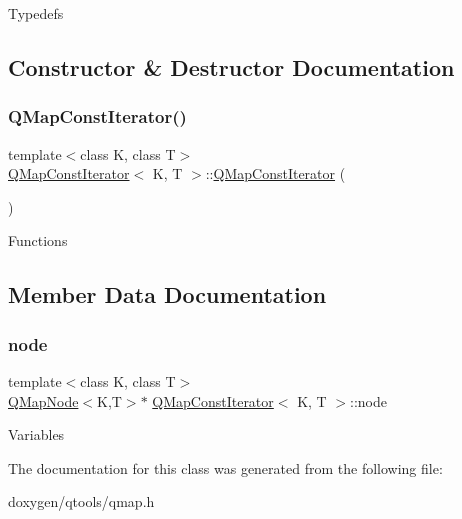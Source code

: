 Typedefs 

\subsection{Constructor \& Destructor Documentation}
\mbox{\label{class_q_map_const_iterator_a86b9986fefaa47f9991d997993074309}} 
\subsubsection{\texorpdfstring{QMapConstIterator()}{QMapConstIterator()}}
{\footnotesize\ttfamily template$<$class K, class T$>$ \\
\mbox{\hyperlink{class_q_map_const_iterator}{Q\+Map\+Const\+Iterator}}$<$ K, T $>$\+::\mbox{\hyperlink{class_q_map_const_iterator}{Q\+Map\+Const\+Iterator}} (\begin{DoxyParamCaption}{ }\end{DoxyParamCaption})\hspace{0.3cm}{\ttfamily [inline]}}

Functions 

\subsection{Member Data Documentation}
\mbox{\label{class_q_map_const_iterator_a8f46f6a6172b01945bae3ca296e3f156}} 
\subsubsection{\texorpdfstring{node}{node}}
{\footnotesize\ttfamily template$<$class K, class T$>$ \\
\mbox{\hyperlink{struct_q_map_node}{Q\+Map\+Node}}$<$K,T$>$$\ast$ \mbox{\hyperlink{class_q_map_const_iterator}{Q\+Map\+Const\+Iterator}}$<$ K, T $>$\+::node}

Variables 

The documentation for this class was generated from the following file\+:\begin{DoxyCompactItemize}
\item 
doxygen/qtools/qmap.\+h\end{DoxyCompactItemize}
